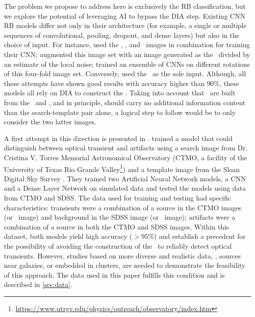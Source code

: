 The problem we propose to address here is exclusively the RB classification, but we explore the potential of leveraging AI to bypass the DIA step. 
Existing CNN RB models differ not only in their architecture (for example, a single or multiple sequences of convolutional, pooling, dropout, and dense layers) but also in the choice of input. For instance, \cite{Gieseke_2017} used the \temp, \search, and \diff\ images in combination for training their CNN; \cite{Cabrera_2016} augmented this image set with an image generated as the \diff\ divided by an estimate of the local noise;  \cite{Cabrera_Vives_2017} trained an ensemble of CNNs on different rotations of this four-fold image set. Conversely, \citet{Liu_2019} used the \diff\ as the sole input. Although, all these attempts have shown good results with accuracy higher than $90\%$, these models all rely on DIA to construct the \diff. Taking into account that \diff\ are built from the \temp\ and \search, and in principle, should carry no additional information content than the search-template pair alone, a logical step to follow would be to only consider the two latter images.  

A first attempt in this direction is presented in \cite{wardega2020detecting}. 
\cite{wardega2020detecting} trained a model that could distinguish between optical transient and artifacts using a search image from Dr. Cristina V. Torres Memorial Astronomical Observatory (CTMO, a facility of the University of Texas Rio Grande Valley\footnote{\url{https://www.utrgv.edu/physics/outreach/observatory/index.htm}}) and a template image from the Sloan Digital Sky Survey \citep[SDSS]{Gunn_2006}. They trained two Artificial Neural Network models, a CNN and a Dense Layer Network on simulated data and tested the models using data from CTMO and SDSS. The data used for training and testing had specific characteristics: transients were a combination of a source in the CTMO images (or \search\ image) and background in the SDSS image (or \temp\ image); artifacts were a combination of a source in both the CTMO and SDSS images. Within this dataset, both models yield high accuracy ($>95\%$) and establish a precedent for the possibility of avoiding the construction of the \diff\ to reliably detect optical transients. However, studies based on more diverse and realistic data, \eg, sources near galaxies, or embedded in clusters, are needed to demonstrate the feasibility of this approach. The data used in this paper fulfills this condition and is described in \autoref{sec:data}.
